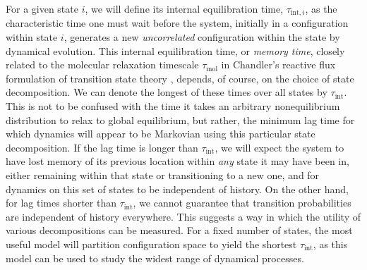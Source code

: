 For a given state $i$, we will define its internal equilibration time, $\tau_{\mathrm{int},i}$, as the characteristic time one must wait before the system, initially in a configuration within state $i$, generates a new \emph{uncorrelated} configuration within the state by dynamical evolution.
This internal equilibration time, or \emph{memory time}, closely related to the molecular relaxation timescale $\tau_\mathrm{mol}$ in Chandler's reactive flux formulation of transition state theory \cite{chandler:1978a}, depends, of course, on the choice of state decomposition.
We can denote the longest of these times over all states by $\tau_\mathrm{int}$.
This is not to be confused with the time it takes an arbitrary nonequilibrium distribution to relax to global equilibrium, but rather, the minimum lag time for which dynamics will appear to be Markovian using this particular state decomposition.  If the lag time is longer than $\tau_\mathrm{int}$, we will expect the system to have lost memory of its previous location within {\em any} state it may have been in, either remaining within that state or transitioning to a new one, and for dynamics on this set of states to be independent of history.
On the other hand, for lag times shorter than $\tau_\mathrm{int}$, we cannot guarantee that transition probabilities are independent of history everywhere.
This suggests a way in which the utility of various decompositions can be measured.
For a fixed number of states, the most useful model will partition configuration space to yield the shortest $\tau_\mathrm{int}$, as this model can be used to study the widest range of dynamical processes.

